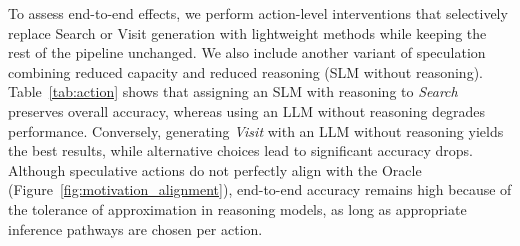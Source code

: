 

To assess end-to-end effects, we perform action-level interventions that selectively replace Search or Visit generation with lightweight methods while keeping the rest of the pipeline unchanged. We also include another variant of speculation combining reduced capacity and reduced reasoning (SLM without reasoning).
Table~\ref{tab:action} shows that assigning an SLM with reasoning to \textit{Search} preserves overall accuracy, whereas using an LLM without reasoning degrades performance. Conversely, generating \textit{Visit} with an LLM without reasoning yields the best results, while alternative choices lead to significant accuracy drops. Although speculative actions do not perfectly align with the Oracle (Figure~\ref{fig:motivation_alignment}), 
end-to-end accuracy remains high because of the tolerance of approximation in reasoning models, as long as appropriate inference pathways are chosen per action.







